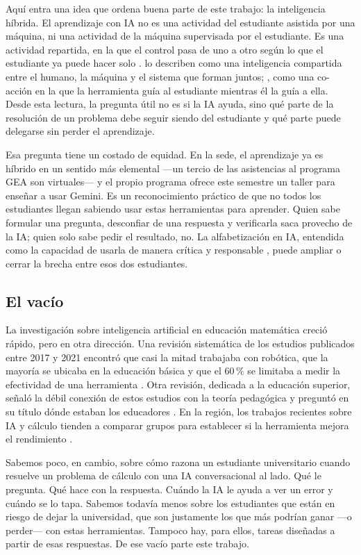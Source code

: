 Aquí entra una idea que ordena buena parte de este trabajo: la inteligencia híbrida. El aprendizaje con IA no es una actividad del estudiante asistida por una máquina, ni una actividad de la máquina supervisada por el estudiante. Es una actividad repartida, en la que el control pasa de uno a otro según lo que el estudiante ya puede hacer solo \parencite{molenaar2022hybrid,jarvela2023hybrid}. \textcite{font2022qedtutrix} lo describen como una inteligencia compartida entre el humano, la máquina y el sistema que forman juntos; \textcite{morenoarmella2009coaction}, como una co-acción en la que la herramienta guía al estudiante mientras él la guía a ella. Desde esta lectura, la pregunta útil no es si la IA ayuda, sino qué parte de la resolución de un problema debe seguir siendo del estudiante y qué parte puede delegarse sin perder el aprendizaje.

Esa pregunta tiene un costado de equidad. En la sede, el aprendizaje ya es híbrido en un sentido más elemental ---un tercio de las asistencias al programa GEA son virtuales--- y el propio programa ofrece este semestre un taller para enseñar a usar Gemini. Es un reconocimiento práctico de que no todos los estudiantes llegan sabiendo usar estas herramientas para aprender. Quien sabe formular una pregunta, desconfiar de una respuesta y verificarla saca provecho de la IA; quien solo sabe pedir el resultado, no. La alfabetización en IA, entendida como la capacidad de usarla de manera crítica y responsable \parencite{unesco2024competencias}, puede ampliar o cerrar la brecha entre esos dos estudiantes.

\subsection*{El vacío}

La investigación sobre inteligencia artificial en educación matemática creció rápido, pero en otra dirección. Una revisión sistemática de los estudios publicados entre 2017 y 2021 encontró que casi la mitad trabajaba con robótica, que la mayoría se ubicaba en la educación básica y que el 60\,\% se limitaba a medir la efectividad de una herramienta \parencite{mohamed2022slr}. Otra revisión, dedicada a la educación superior, señaló la débil conexión de estos estudios con la teoría pedagógica y preguntó en su título dónde estaban los educadores \parencite{zawacki2019systematic}. En la región, los trabajos recientes sobre IA y cálculo tienden a comparar grupos para establecer si la herramienta mejora el rendimiento \parencite{mateo2024estrategia}.

Sabemos poco, en cambio, sobre cómo razona un estudiante universitario cuando resuelve un problema de cálculo con una IA conversacional al lado. Qué le pregunta. Qué hace con la respuesta. Cuándo la IA le ayuda a ver un error y cuándo se lo tapa. Sabemos todavía menos sobre los estudiantes que están en riesgo de dejar la universidad, que son justamente los que más podrían ganar ---o perder--- con estas herramientas. Tampoco hay, para ellos, tareas diseñadas a partir de esas respuestas. De ese vacío parte este trabajo.
